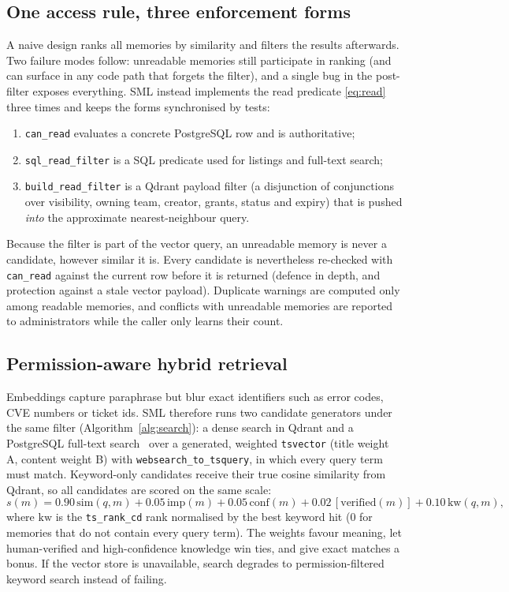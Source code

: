 \documentclass[11pt,a4paper]{article}
\newcommand{\sys}{SML}
\begin{document}
\subsection{One access rule, three enforcement forms}
\label{sec:access}

A naive design ranks all memories by similarity and filters the results afterwards. Two failure modes
follow: unreadable memories still participate in ranking (and can surface in any code path that forgets the
filter), and a single bug in the post-filter exposes everything. \sys{} instead implements the read predicate
\eqref{eq:read} three times and keeps the forms synchronised by tests:
\begin{enumerate}[leftmargin=*]
  \item \texttt{can\_read} evaluates a concrete PostgreSQL row and is authoritative;
  \item \texttt{sql\_read\_filter} is a SQL predicate used for listings and full-text search;
  \item \texttt{build\_read\_filter} is a Qdrant payload filter (a disjunction of conjunctions over
  visibility, owning team, creator, grants, status and expiry) that is pushed \emph{into} the
  approximate nearest-neighbour query.
\end{enumerate}
Because the filter is part of the vector query, an unreadable memory is never a candidate, however
similar it is. Every candidate is nevertheless re-checked with \texttt{can\_read} against the current row
before it is returned (defence in depth, and protection against a stale vector payload). Duplicate warnings
are computed only among readable memories, and conflicts with unreadable memories are reported to
administrators while the caller only learns their count.

\subsection{Permission-aware hybrid retrieval}
\label{sec:retrieval}

Embeddings capture paraphrase but blur exact identifiers such as error codes, CVE numbers or ticket ids.
\sys{} therefore runs two candidate generators under the same filter (Algorithm~\ref{alg:search}): a dense
search in Qdrant and a PostgreSQL full-text search~\cite{postgres2023fts} over a generated, weighted
\texttt{tsvector} (title weight A, content weight B) with \texttt{websearch\_to\_tsquery}, in which every
query term must match. Keyword-only candidates receive their true cosine similarity from Qdrant, so all
candidates are scored on the same scale:
\begin{equation}
s(m) = 0.90\,\mathrm{sim}(q,m) + 0.05\,\mathrm{imp}(m) + 0.05\,\mathrm{conf}(m) + 0.02\,[\mathrm{verified}(m)] + 0.10\,\mathrm{kw}(q,m),
\label{eq:score}
\end{equation}
where $\mathrm{kw}$ is the \texttt{ts\_rank\_cd} rank normalised by the best keyword hit (0 for memories
that do not contain every query term). The weights favour meaning, let human-verified and high-confidence
knowledge win ties, and give exact matches a bonus. If the vector store is unavailable, search degrades to
permission-filtered keyword search instead of failing.
\end{document}
